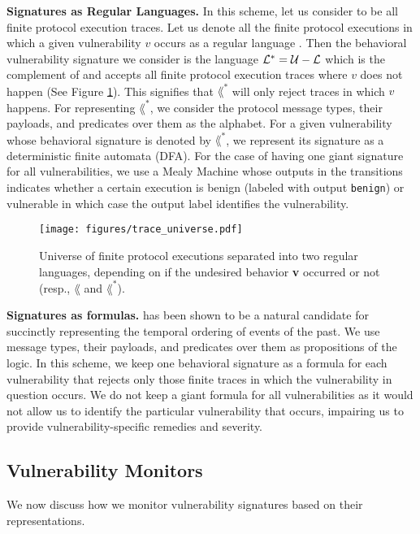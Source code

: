 \textbf{Signatures as Regular Languages.}
In this scheme, let us consider  to be all finite protocol execution
traces. Let us denote all the finite protocol executions in which a given vulnerability $v$
occurs as a regular language \lang. Then the behavioral vulnerability signature we consider
is the language $\mathcal{L}^* = \mathcal{U}-\mathcal{L}$ which is the complement of \lang and accepts all finite protocol
execution traces where $v$  does not happen (See Figure \ref{fig:universe_of_traces}). This signifies that
$\lang^*$ will only reject traces in which $v$ happens. For representing $\lang^*$,
we consider the protocol message types, their payloads, and predicates over them
as the alphabet. For a given vulnerability whose behavioral
signature is denoted by $\lang^*$, we represent its signature as a deterministic
finite automata (DFA). For the case of having one giant signature for all vulnerabilities,
we use a Mealy Machine whose outputs in the transitions indicates whether a certain
execution is benign (labeled with output \texttt{benign}) or vulnerable in which case the output label identifies the vulnerability.

\begin{figure}[t]
  \centering
	\texttt{[image: figures/trace\_universe.pdf]}
	\caption{Universe of finite protocol executions separated into two regular languages,
  depending on if the undesired behavior
  \textbf{v} occurred or not (resp., $\lang$ and $\lang^*$).}
	\label{fig:universe_of_traces}
\end{figure}



\textbf{Signatures as \pltl formulas.}
\pltl has been shown to be a natural candidate for succinctly representing the
temporal ordering of events of the past. We use message types, their payloads,
and predicates over them as propositions of the logic.
In this scheme, we keep one behavioral
signature as a \pltl formula for each vulnerability that rejects only those finite
traces in which the vulnerability in question occurs. We do not keep a giant \pltl
formula for all vulnerabilities as it would not allow us to identify the particular vulnerability
that occurs, impairing us to provide vulnerability-specific remedies and severity.



\subsection{Vulnerability Monitors}
We now discuss how we monitor vulnerability signatures based on their
representations.

